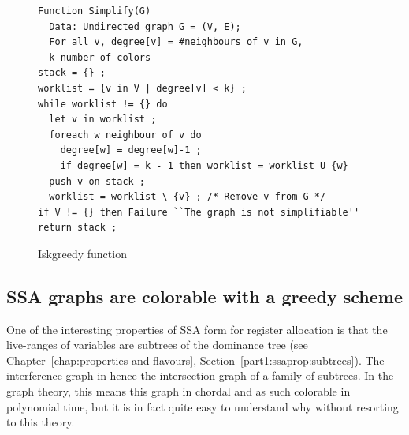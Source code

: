 { 

\begin{figure}
\begin{verbatim}
Function Simplify(G)
  Data: Undirected graph G = (V, E);
  For all v, degree[v] = #neighbours of v in G,
  k number of colors
stack = {} ;
worklist = {v in V | degree[v] < k} ;
while worklist != {} do
  let v in worklist ;
  foreach w neighbour of v do
    degree[w] = degree[w]-1 ;
    if degree[w] = k - 1 then worklist = worklist U {w}
  push v on stack ;
  worklist = worklist \ {v} ; /* Remove v from G */
if V != {} then Failure ``The graph is not simplifiable''
return stack ;
\end{verbatim}
\caption{Iskgreedy function}
\label{code:is-k-greedy}
\end{figure}



\subsection{SSA graphs are colorable with a greedy scheme}
\label{sec:regalloc:ssa-greedy}

One of the interesting properties of SSA form for register allocation is that the live-ranges of variables are subtrees of the dominance tree (see Chapter~\ref{chap:properties-and-flavours}, Section~\ref{part1:ssaprop:subtrees}).
The interference graph in hence the intersection graph of a family of subtrees.
In the graph theory, this means this graph in chordal and as such colorable in polynomial time, but it is in fact quite easy to understand why without resorting to this theory.

}
